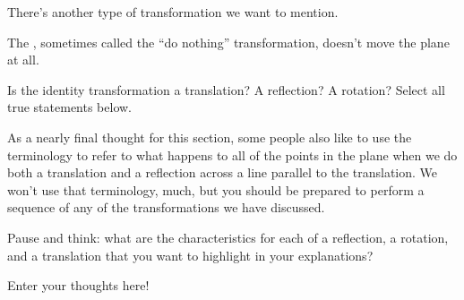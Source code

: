 \documentclass{ximera}
\begin{document}
There's another type of transformation we want to mention.
\begin{definition}
The , sometimes called the ``do nothing'' transformation, doesn’t move the plane at all.
\end{definition}

\begin{question}
Is the identity transformation a translation? A reflection? A rotation? Select all true statements below.
\begin{selectAll}
\end{selectAll}
\end{question}

As a nearly final thought for this section, some people also like to use the terminology  to refer to what happens to all of the points in the plane when we do both a translation and a reflection across a line parallel to the translation. We won't use that terminology, much, but you should be prepared to perform a sequence of any of the transformations we have discussed.


\begin{question}
Pause and think: what are the characteristics for each of a reflection, a rotation, and a translation that you want to highlight in your explanations?
\begin{freeResponse}
Enter your thoughts here!
\end{freeResponse}
\end{question}
\end{document}
